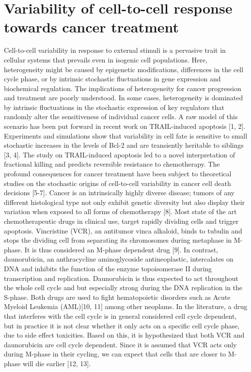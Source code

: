 \documentclass[pdftex,12pt,a4paper]{report}
\begin{document}
\section{Variability of cell-to-cell response towards cancer treatment}


Cell-to-cell variability in response to external stimuli is a pervasive trait in cellular systems that prevails even in isogenic cell populations. Here, heterogeneity might be caused by epigenetic modifications, differences in the cell cycle phase, or by intrinsic stochastic fluctuations in gene expression and biochemical regulation. The implications of heterogeneity for cancer progression and treatment are poorly understood. In some cases, heterogeneity is dominated by intrinsic fluctuations in the stochastic expression of key regulators that randomly alter the sensitiveness of individual cancer cells. A raw model of this scenario has been put forward in recent work on TRAIL-induced apoptosis [1, 2]. Experiments and simulations show that variability in cell fate is sensitive to small stochastic increases in the levels of Bcl-2 and are transiently heritable to siblings [3, 4]. The study on TRAIL-induced apoptosis led to a novel interpretation of fractional killing and predicts reversible resistance to chemotherapy. The profound consequences for cancer treatment have been subject to theoretical studies on the stochastic origins of cell-to-cell variability in cancer cell death decisions [5-7]. 
Cancer is an intrinsically highly diverse disease; tumors of any different histological type not only exhibit genetic diversity but also display their variation when exposed to all forms of chemotherapy [8]. Most state of the art chemotherapeutic drugs in clinical use, target rapidly dividing cells and trigger apoptosis. Vincristine (VCR), an antitumor vinca alkaloid, binds to tubulin and stops the dividing cell from separating its chromosomes during metaphase in M-phase. It is thus considered an M-phase dependent drug [9]. In contrast, daunorubicin, an anthracycline aminoglycoside antineoplastic, intercalates on DNA and inhibits the function of the enzyme topoisomerase II during transcription and replication. Daunorubicin is thus expected to act throughout the whole cell cycle and but especially strong during the DNA replication in the S-phase. Both drugs are used to fight hematopoietic disorders such as Acute Myeloid Leukemia (AML)[10, 11] among other neoplams. In the literature, a drug that interferes with the cell cycle is in general considered cell cycle dependent, but in practice it is not clear whether it only acts on a specific cell cycle phase, due to side effect toxicities. Based on this, it is hypothesized that both VCR and daunorubicin are cell cycle dependent. Since it is assumed that VCR acts only during M-phase in their cycling, we can expect that cells that are closer to M-phase will die earlier [12, 13].  
\end{document}
